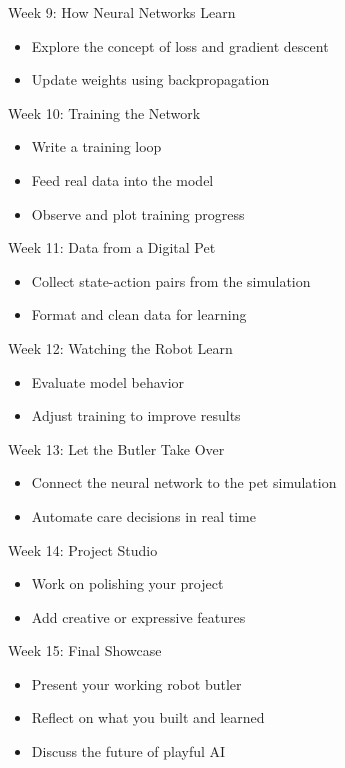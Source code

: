 \documentclass[10pt]{book}
\begin{document}
Week 9: How Neural Networks Learn
\begin{itemize}
  \item Explore the concept of loss and gradient descent
  \item Update weights using backpropagation
\end{itemize}

Week 10: Training the Network
\begin{itemize}
  \item Write a training loop
  \item Feed real data into the model
  \item Observe and plot training progress
\end{itemize}

Week 11: Data from a Digital Pet
\begin{itemize}
  \item Collect state-action pairs from the simulation
  \item Format and clean data for learning
\end{itemize}

Week 12: Watching the Robot Learn
\begin{itemize}
  \item Evaluate model behavior
  \item Adjust training to improve results
\end{itemize}

Week 13: Let the Butler Take Over
\begin{itemize}
  \item Connect the neural network to the pet simulation
  \item Automate care decisions in real time
\end{itemize}

Week 14: Project Studio
\begin{itemize}
  \item Work on polishing your project
  \item Add creative or expressive features
\end{itemize}

Week 15: Final Showcase
\begin{itemize}
  \item Present your working robot butler
  \item Reflect on what you built and learned
  \item Discuss the future of playful AI
\end{itemize}
\end{document}
